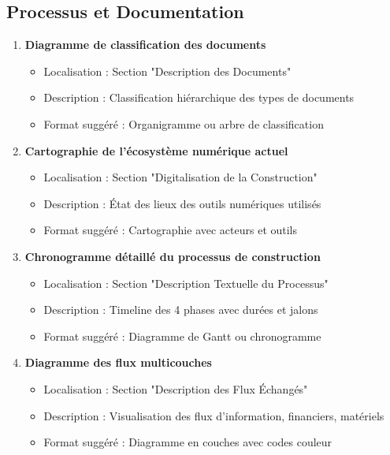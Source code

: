 \subsection{Processus et Documentation}

\begin{enumerate}
    \item \textbf{Diagramme de classification des documents}
    \begin{itemize}
        \item Localisation : Section "Description des Documents"
        \item Description : Classification hiérarchique des types de documents
        \item Format suggéré : Organigramme ou arbre de classification
    \end{itemize}
    
    \item \textbf{Cartographie de l'écosystème numérique actuel}
    \begin{itemize}
        \item Localisation : Section "Digitalisation de la Construction"
        \item Description : État des lieux des outils numériques utilisés
        \item Format suggéré : Cartographie avec acteurs et outils
    \end{itemize}
    
    \item \textbf{Chronogramme détaillé du processus de construction}
    \begin{itemize}
        \item Localisation : Section "Description Textuelle du Processus"
        \item Description : Timeline des 4 phases avec durées et jalons
        \item Format suggéré : Diagramme de Gantt ou chronogramme
    \end{itemize}
    
    \item \textbf{Diagramme des flux multicouches}
    \begin{itemize}
        \item Localisation : Section "Description des Flux Échangés"
        \item Description : Visualisation des flux d'information, financiers, matériels
        \item Format suggéré : Diagramme en couches avec codes couleur
    \end{itemize}
\end{enumerate}

